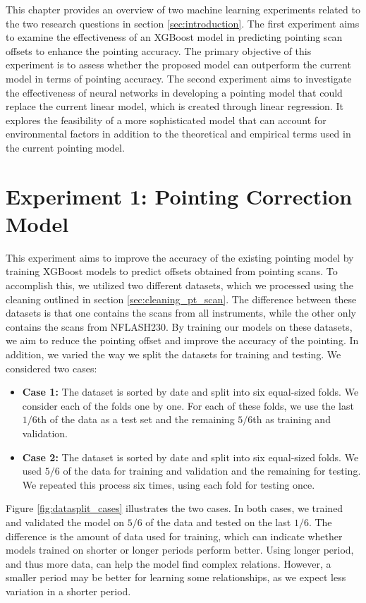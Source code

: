 
This chapter provides an overview of two machine learning experiments related to the two research questions in section \ref{sec:introduction}.
The first experiment aims to examine the effectiveness of an XGBoost model in predicting pointing scan offsets to enhance the pointing accuracy.
The primary objective of this experiment is to assess whether the proposed model can outperform the current model in terms of pointing accuracy.
The second experiment aims to investigate the effectiveness of neural networks in developing a pointing model that could replace the current linear model, which is created through linear regression.
It explores the feasibility of a more sophisticated model that can account for environmental factors in addition to the theoretical and empirical terms used in the current pointing model.

\section{Experiment 1: Pointing Correction Model} \label{sec:exp1}
This experiment aims to improve the accuracy of the existing pointing model by training XGBoost models to predict offsets obtained from pointing scans.
To accomplish this, we utilized two different datasets, which we processed using the cleaning outlined in section \ref{sec:cleaning_pt_scan}.
The difference between these datasets is that one contains the scans from all instruments, while the other only contains the scans from NFLASH230.
By training our models on these datasets, we aim to reduce the pointing offset and improve the accuracy of the pointing.
In addition, we varied the way we split the datasets for training and testing.
We considered two cases:

\begin{itemize}
    \item \textbf{Case 1:} The dataset is sorted by date and split into six equal-sized folds.
    We consider each of the folds one by one.
    For each of these folds, we use the last $1/6$th of the data as a test set and the remaining $5/6$th as training and validation.
    \item \textbf{Case 2:} The dataset is sorted by date and split into six equal-sized folds.
    We used $5/6$ of the data for training and validation and the remaining for testing.
    We repeated this process six times, using each fold for testing once.
\end{itemize}

Figure \ref{fig:datasplit_cases} illustrates the two cases.
In both cases, we trained and validated the model on $5/6$ of the data and tested on the last $1/6$.
The difference is the amount of data used for training, which can indicate whether models trained on shorter or longer periods perform better.
Using longer period, and thus more data, can help the model find complex relations.
However, a smaller period may be better for learning some relationships, as we expect less variation in a shorter period.

